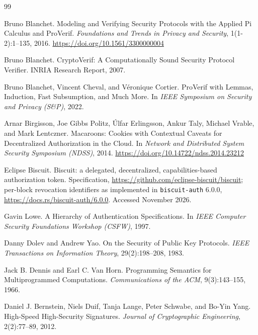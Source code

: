 \documentclass[11pt,a4paper]{article}
\theoremstyle{definition}
\begin{document}

\begin{thebibliography}{99}

Bruno Blanchet.
\newblock Modeling and Verifying Security Protocols with the Applied Pi Calculus and ProVerif.
\newblock \textit{Foundations and Trends in Privacy and Security}, 1(1-2):1--135, 2016.
\newblock \url{https://doi.org/10.1561/3300000004}

Bruno Blanchet.
\newblock CryptoVerif: A Computationally Sound Security Protocol Verifier.
\newblock INRIA Research Report, 2007.

Bruno Blanchet, Vincent Cheval, and Véronique Cortier.
\newblock ProVerif with Lemmas, Induction, Fast Subsumption, and Much More.
\newblock In \textit{IEEE Symposium on Security and Privacy (S\&P)}, 2022.

Arnar Birgisson, Joe Gibbs Politz, Úlfar Erlingsson, Ankur Taly, Michael Vrable, and Mark Lentczner.
\newblock Macaroons: Cookies with Contextual Caveats for Decentralized Authorization in the Cloud.
\newblock In \textit{Network and Distributed System Security Symposium (NDSS)}, 2014.
\newblock \url{https://doi.org/10.14722/ndss.2014.23212}

Eclipse Biscuit.
\newblock Biscuit: a delegated, decentralized, capabilities-based authorization token.
\newblock Specification, \url{https://github.com/eclipse-biscuit/biscuit}; per-block revocation identifiers as implemented in \texttt{biscuit-auth} 6.0.0, \url{https://docs.rs/biscuit-auth/6.0.0}. Accessed November 2026.

Gavin Lowe.
\newblock A Hierarchy of Authentication Specifications.
\newblock In \textit{IEEE Computer Security Foundations Workshop (CSFW)}, 1997.

Danny Dolev and Andrew Yao.
\newblock On the Security of Public Key Protocols.
\newblock \textit{IEEE Transactions on Information Theory}, 29(2):198--208, 1983.

Jack B. Dennis and Earl C. Van Horn.
\newblock Programming Semantics for Multiprogrammed Computations.
\newblock \textit{Communications of the ACM}, 9(3):143--155, 1966.

Daniel J. Bernstein, Niels Duif, Tanja Lange, Peter Schwabe, and Bo-Yin Yang.
\newblock High-Speed High-Security Signatures.
\newblock \textit{Journal of Cryptographic Engineering}, 2(2):77--89, 2012.


\end{thebibliography}
\end{document}
